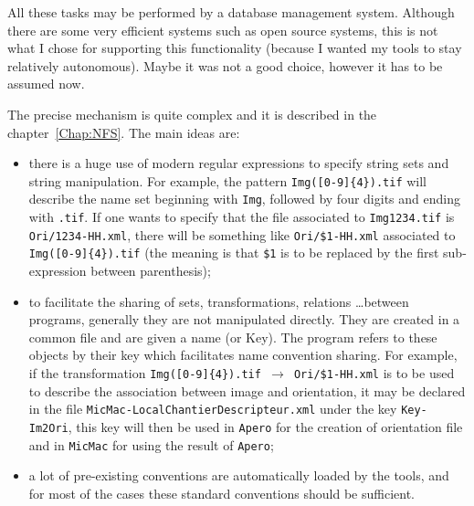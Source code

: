All these tasks may be performed by a database management system. Although there
are some very efficient systems such as open source systems, this is not what I chose
for supporting this functionality (because I wanted my tools to stay relatively autonomous).
Maybe it was not a good choice, however it has to be assumed now.


The precise mechanism is quite complex and it is described in the chapter~\ref{Chap:NFS}.
The main ideas are:

\begin{itemize}
   \item there is a huge use of modern regular expressions to specify string sets and
         string manipulation. For example, the pattern {\tt Img([0-9]\{4\}).tif} will
         describe the name set beginning with {\tt Img}, followed by four digits and ending
         with {\tt .tif}. If one wants to specify that the file associated  to {\tt Img1234.tif}
         is {\tt Ori/1234-HH.xml}, there will be something like {\tt  Ori/\$1-HH.xml} associated
        to {\tt Img([0-9]\{4\}).tif}  (the meaning is that {\tt \$1}  is to be replaced by
          the first sub-expression between parenthesis);



   \item to facilitate the sharing of sets, transformations, relations \dots between programs,
         generally they are not manipulated directly. They are created in a common file and
         are given a name (or Key). The program refers to these objects by their key which
         facilitates name convention sharing. For example, if the transformation
         {\tt Img([0-9]\{4\}).tif $\rightarrow$  Ori/\$1-HH.xml} is to be used
         to describe the association between image and orientation, it  may be declared in
         the file {\tt MicMac-LocalChantierDescripteur.xml} under the key {\tt Key-Im2Ori},
         this key will then be used in {\tt Apero} for the creation of orientation file and in
         {\tt MicMac} for using the result of {\tt Apero};


     \item a lot of pre-existing conventions are automatically loaded by the tools, and
           for most of the cases these standard conventions should be sufficient.
\end{itemize}




